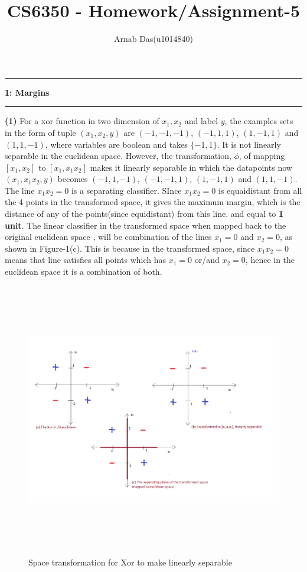 \documentclass{article}
\title{CS6350 - Homework/Assignment-5}
\author{Arnab Das(u1014840)}
\newcommand\question[2]{\vspace{.25in}\hrule\textbf{#1: #2}\hrule\vspace{.10in}}
\renewcommand\part[1]{\vspace{.10in}\textbf{(#1)}}
\begin{document}
  \maketitle
  \newpage
  \newcommand\NAME{ARNAB DAS}
  \newcommand\UID{uxxxxxxx}
  \newcommand\HWNUM{4}

  \question{1}{Margins}
  \part{1} For a xor function in two dimension of $x_{1},x_{2}$ and label $y$, the examples sets in the form of tuple $(x_1, x_2, y)$ are $(-1,-1,-1)$, $(-1,1,1)$, $(1,-1,1)$ and $(1,1,-1)$, where variables are boolean and takes $\{-1,1\}$. It is not linearly separable in the euclidean space. However, the transformation, $\phi$, of mapping $[x_1, x_2]$ to $[x_1, x_1x_2]$ makes it linearly separable in which the datapoints now $(x_1, x_1x_2, y)$ becomes $(-1,1,-1)$, $(-1,-1,1)$, $(1,-1,1)$ and $(1,1,-1)$. The line $x_1x_2=0$ is a separating classifier. SInce $x_1x_2=0$ is equaidistant from all the 4 points in the transformed space, it gives the maximum margin, which is the distance of any of the points(since equidistant) from this line. and equal to \textbf {1 unit}.  The linear classifier in the transformed space when mapped back to the original euclidean space , will be combination of the lines $x_1=0$ and $x_2=0$, as shown in Figure-1(c). This is because in the transformed space, since $x_1x_2=0$ means that line satisfies all points which has $x_1=0$ or/and $x_2=0$, hence in the euclidean space it is a combination of both. \newline

  \begin{figure}[H]
   \centering
  \includegraphics[width=12cm, height=12cm]{Prob1a}
  \caption{Space transformation for Xor to make linearly separable}
  \end{figure}
\end{document}
